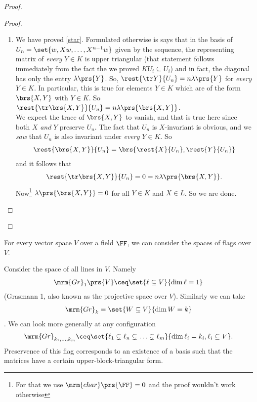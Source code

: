 \documentclass[10pt,a4paper,twoside,openany,hidelinks]{book}
\begin{document}
\begin{proof}
\begin{description}
\begin{proof}
\begin{enumerate}[label = \Roman*)]
\begin{proof}
\begin{enumerate}[label = (\roman*)]
\begin{itemize}
But by definition, $X U_{i-1} \subseteq U_i$. Hence
\[XYX^{i-1} = \lambda\prs{Y}X^i + w''\]
where $w'' \in U_i$.
\item The second summand \[\brs{X,Y}X^{i-1}w = \lambda\prs{\brs{X,Y}}X^{i-1}w + w'''\] where $w''' \in U_{i-1}$ by the induction hypothesis.
This means \[\brs{X,Y} X^{i-1}w \in U_i + U_{i-1} \subseteq U_i\text{.}\]
\end{itemize}
The net conclusion is that
\begin{align*}
YX^i w = \lambda\prs{Y}X^i w + w''''
\end{align*}
with $w'''' \in U_i$.
So $YX^iw \equiv \lambda\prs{Y}X^i w \mod{U_i}$ for all $1 \leq i \leq n$.
\end{enumerate}
\end{proof}
\item We have proved \eqref{star}. Formulated otherwise is says that in the basis of $U_n = \set{w, Xw, \ldots, X^{n-1}w}$ given by the sequence, the representing matrix of \emph{every} $Y \in K$ is upper triangular (that statement follows immediately from the fact the we proved $KU_i \subseteq U_i$) and in fact, the diagonal has only the entry $\lambda\prs{Y}$.
So, $\rest{\tr Y}{U_n} = n\lambda\prs{Y}$ for \emph{every} $Y \in K$.
In particular, this is true for elements $Y \in K$ which are of the form $\brs{X,Y}$ with $Y \in K$.
So $\rest{\tr \brs{X,Y}}{U_n} = n\lambda\prs{\brs{X,Y}}$. \\
We expect the trace of $\brs{X,Y}$ to vanish, and that is true here since both $X$ \emph{and} $Y$ preserve $U_n$. The fact that $U_n$ is $X$-invariant is obvious, and we \emph{saw} that $U_n$ is also invariant under \emph{every} $Y \in K$.
So
\[\rest{\brs{X,Y}}{U_n} = \brs{\rest{X}{U_n}, \rest{Y}{U_n}}\]
and it follows that
\[\rest{\tr\brs{X,Y}}{U_n} = 0 = n\lambda\prs{\brs{X,Y}}\text{.}\]
Now\footnote{For that we use $\mrm{char}\prs{\FF} = 0$ and the proof wouldn't work otherwise} $\lambda\prs{\brs{X,Y}} = 0$ for all $Y \in K$ and $X \in L$. So we are done.
\end{enumerate}
\end{proof}
\end{description}
\end{proof}
\begin{remark}
For every vector space $V$ over a field $\FF$,%
we can consider the spaces of flags over $V$.
\end{remark}
\begin{example}
Consider the space of all lines in $V$. Namely \[\mrm{Gr}_1\prs{V} \ceq \set{\ell \subseteq V}{\dim \ell = 1}\] (Grasmann 1, also known as the projective space over $V$).
Similarly we can take
\[\mrm{Gr}_k = \set{W \subseteq V}{\dim W = k}\] .
We can look more generally at any configuration
\[\mrm{Gr}_{k_1, \ldots, k_m} \ceq \set{\ell_1 \subsetneq \ell_n \subsetneq \ldots \subsetneq \ell_m}{\dim \ell_i = k_i , \ell_i \subseteq V}\text{.}\]
Preservence of this flag corresponds to an existence of a basis such that the matrices have a certain upper-block-triangular form.
\end{example}
\end{document}

